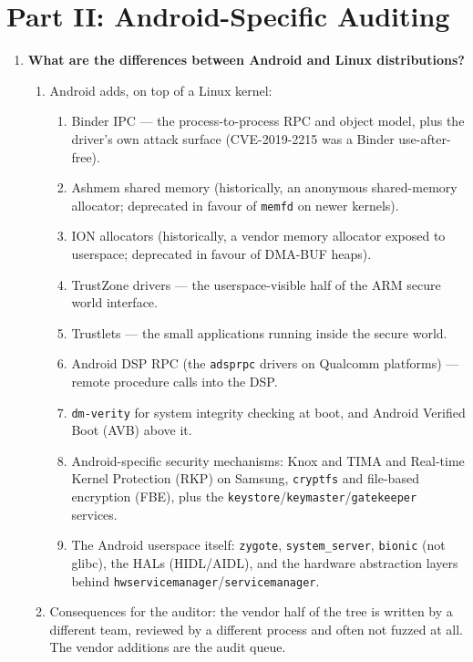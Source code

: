 \documentclass[12pt]{Training}
\begin{document}

\section*{Part II: Android-Specific Auditing}
\begin{enumerate}
    \item \textbf{What are the differences between Android and Linux distributions?}
    \begin{enumerate}
        \item Android adds, on top of a Linux kernel:
        \begin{enumerate}
            \item Binder IPC --- the process-to-process RPC and object model, plus the driver's own attack surface (CVE-2019-2215 was a Binder use-after-free).
            \item Ashmem shared memory (historically, an anonymous shared-memory allocator; deprecated in favour of \lstinline{memfd} on newer kernels).
            \item ION allocators (historically, a vendor memory allocator exposed to userspace; deprecated in favour of DMA-BUF heaps).
            \item TrustZone drivers --- the userspace-visible half of the ARM secure world interface.
            \item Trustlets --- the small applications running inside the secure world.
            \item Android DSP RPC (the \lstinline{adsprpc} drivers on Qualcomm platforms) --- remote procedure calls into the DSP.
            \item \lstinline{dm-verity} for system integrity checking at boot, and Android Verified Boot (AVB) above it.
            \item Android-specific security mechanisms: Knox and TIMA and Real-time Kernel Protection (RKP) on Samsung, \lstinline{cryptfs} and file-based encryption (FBE), plus the \lstinline{keystore}/\lstinline{keymaster}/\lstinline{gatekeeper} services.
            \item The Android userspace itself: \lstinline{zygote}, \lstinline{system_server}, \lstinline{bionic} (not glibc), the HALs (HIDL/AIDL), and the hardware abstraction layers behind \lstinline{hwservicemanager}/\lstinline{servicemanager}.
        \end{enumerate}
        \item Consequences for the auditor: the vendor half of the tree is written by a different team, reviewed by a different process and often not fuzzed at all. The vendor additions are the audit queue.

\end{enumerate}
\end{enumerate}
\end{document}
